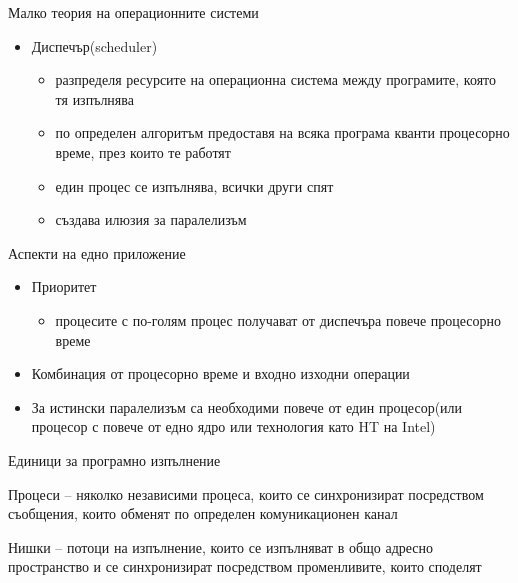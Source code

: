 \documentclass{beamer}
\begin{document}
\begin{frame}{Малко теория на операционните системи}
  \transdissolve
  \begin{itemize}
  \item Диспечър(scheduler)
    \begin{itemize}
      \item разпределя ресурсите на операционна система между
        програмите, която тя изпълнява
      \item по определен алгоритъм предоставя на всяка програма кванти
        процесорно време, през които те работят
      \item един процес се изпълнява, всички други спят
      \item създава илюзия за паралелизъм
    \end{itemize}

  \end{itemize}
\end{frame}

\begin{frame}{Аспекти на едно приложение}
  \transdissolve
  \begin{itemize}
  \item Приоритет
    \begin{itemize}
      \item процесите с по-голям процес получават от диспечъра повече
        процесорно време
    \end{itemize}

  \item Комбинация от процесорно време и входно изходни операции

  \item За истински паралелизъм са необходими повече от един
    процесор(или процесор с повече от едно ядро или технология като HT
    на Intel)
  \end{itemize}
\end{frame}

\begin{frame}{Единици за програмно изпълнение}
  \transdissolve
  \begin{block}{Процеси}
     – няколко независими процеса,
     които се синхронизират посредством
    съобщения, които обменят по определен
    комуникационен канал
  \end{block}
  \begin{block}{Нишки}
    – потоци на изпълнение, които се
    изпълняват в общо адресно
    пространство и се синхронизират
    посредством променливите, които
    споделят
  \end{block}
\end{frame}
\end{document}
